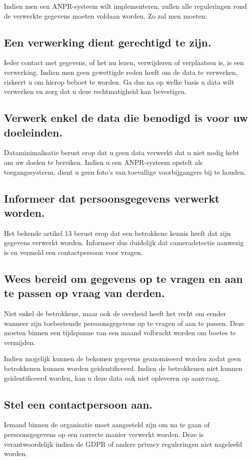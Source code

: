 Indien men een ANPR-systeem wilt implementeren, zullen alle reguleringen rond de verwerkte gegevens moeten voldaan worden. Zo zal men moeten:

\subsection{Een verwerking dient gerechtigd te zijn.}
Ieder contact met gegevens, of het nu lezen, verwijderen of verplaatsen is, is een verwerking. Indien men geen gewettigde reden heeft om de data te verwerken, riskeert u om hierop beboet te worden. Ga dus na op welke basis u data wilt verwerken en zorg dat u deze rechtmatigheid kan bevestigen.

\subsection{Verwerk enkel de data die benodigd is voor uw doeleinden.}
Dataminimalisatie berust erop dat u geen data verwerkt dat u niet nodig hebt om uw doelen te bereiken. Indien u een ANPR-systeem opstelt als toegangssysteem, dient u geen foto's van toevallige voorbijgangers bij te houden.

\subsection{Informeer dat persoonsgegevens verwerkt worden.}
Het bekende artikel 13 berust erop dat een betrokkene kennis heeft dat zijn gegevens verwerkt worden. Informeer dus duidelijk dat cameradetectie aanwezig is en vermeld een contactpersoon voor vragen.

\subsection{Wees bereid om gegevens op te vragen en aan te passen op vraag van derden.}
Niet enkel de betrokkene, maar ook de overheid heeft het recht om eender wanneer zijn toebestemde persoonsgegevens op te vragen of aan te passen. Deze moeten binnen een tijdspanne van een maand volbracht worden om boetes te vermijden.

Indien mogelijk kunnen de bekomen gegevens geanomiseerd worden zodat geen betrokkenen kunnen worden geïdentificeerd. Indien de betrokkenen niet kunnen geïdentificeerd worden, kan u deze data ook niet opleveren op aanvraag.

\subsection{Stel een contactpersoon aan.}
Iemand binnen de organisatie moet aangesteld zijn om na te gaan of persoonsgegevens op een correcte manier verwerkt worden. Deze is verantwoordelijk indien de GDPR of andere privacy reguleringen niet nageleefd worden.

